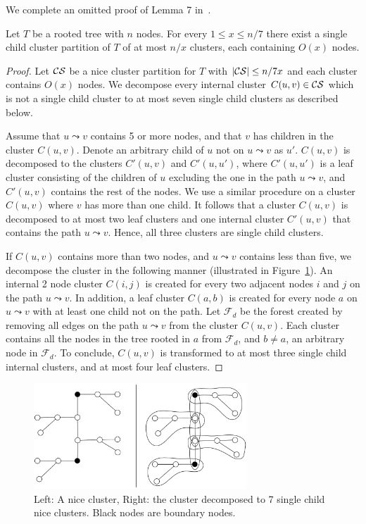 We complete an omitted   proof of  Lemma 7  in~\cite{Alstrup02}. 
\begin{lemma}\label{lemma:nice_decomp}
Let $T$ be a rooted tree with $n$ nodes. For every  $ 1 \leq x \leq n /7$ there exist a single child cluster partition of $T$ of at most $n/x$ clusters, each containing $O(x)$ nodes.
\end{lemma}

\begin{proof}
Let $ \mathcal{CS}$ be a  nice cluster partition for $T$ with $\vert  \mathcal{CS} \vert \leq n/7x$ and each cluster contains $O(x)$ nodes.
We decompose every  internal cluster $C(u,v) \in   \mathcal{CS}$ which is  not a single child cluster to at most  seven single child clusters as described below. 

Assume  that $u \leadsto v$ contains 5 or more nodes, and  that  $v$ has  children in  the cluster $C(u,v)$. Denote an arbitrary child of $u$ not on $u \leadsto v$ as $u'$.
 $C(u,v)$ is decomposed to  the clusters $C'(u,v)$ and $C'(u,u')$, where $C'(u,u')$ is a leaf cluster consisting of the  children of $u$ excluding the one in the path $u \leadsto v$, and $C'(u,v)$ contains the rest of the nodes.
We use a similar procedure on  a cluster $C(u,v)$ where $v$ has more than one child.
It follows that a cluster $C(u,v)$ is decomposed to  at most two leaf clusters and one internal cluster $C'(u,v)$ that contains the path $u \leadsto v$.
Hence, all three clusters are single child clusters.

If  $C(u,v)$ contains more than two nodes, and  $u \leadsto v$ contains less than five, we decompose the cluster  in the following manner (illustrated in Figure~\ref{fig:crazyeleven}).
An internal 2 node cluster $C(i,j)$ is created for every two adjacent nodes $i$ and $j$ on the path $u \leadsto v$.
In addition, a leaf cluster $C(a,b)$ is created  for every node $a$ on $u \leadsto v$  with at least one child not on the path.
Let $\mathcal{F}_d$ be the forest created by removing all edges on the path $u \leadsto v$ from the cluster $C(u,v)$.
Each cluster contains all the nodes in the tree rooted in $a$ from $\mathcal{F}_d$, and $b \neq a$, an arbitrary  node in $\mathcal{F}_d$.
To conclude, $C(u,v)$ is transformed to at most three single child internal clusters, and at most four leaf clusters.
\end{proof}

				\begin{figure} 
				\centering
				\includegraphics[width=80mm]{./Figures/7.pdf}
				\caption{Left: A nice cluster, Right: the cluster decomposed to 7 single child nice clusters. Black nodes are boundary nodes.}
				\label{fig:crazyeleven}
			\end{figure}
			
